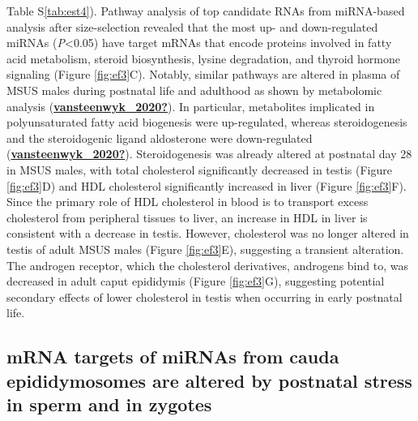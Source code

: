 \documentclass[12pt,twoside]{reedthesis}
\begin{document}
Table S\ref{tab:est4}). Pathway analysis of top candidate RNAs from miRNA-based
analysis after size-selection revealed that the most up- and
down-regulated miRNAs (\emph{P}\textless0.05) have target mRNAs that encode proteins
involved in fatty acid metabolism, steroid biosynthesis, lysine
degradation, and thyroid hormone signaling (Figure \ref{fig:ef3}C). Notably,
similar pathways are altered in plasma of MSUS males during postnatal
life and adulthood as shown by metabolomic analysis (\protect\hyperlink{ref-vansteenwyk_2020}{\textbf{vansteenwyk\_2020?}}). In
particular, metabolites implicated in polyunsaturated fatty acid
biogenesis were up-regulated, whereas steroidogenesis and the
steroidogenic ligand aldosterone were down-regulated (\protect\hyperlink{ref-vansteenwyk_2020}{\textbf{vansteenwyk\_2020?}}).
Steroidogenesis was already altered at postnatal day 28 in MSUS males,
with total cholesterol significantly decreased in testis (Figure \ref{fig:ef3}D)
and HDL cholesterol significantly increased in liver (Figure \ref{fig:ef3}F).
Since the primary role of HDL cholesterol in blood is to transport
excess cholesterol from peripheral tissues to liver, an increase in HDL
in liver is consistent with a decrease in testis. However, cholesterol
was no longer altered in testis of adult MSUS males (Figure \ref{fig:ef3}E),
suggesting a transient alteration. The androgen receptor, which the
cholesterol derivatives, androgens bind to, was decreased in adult caput
epididymis (Figure \ref{fig:ef3}G), suggesting potential secondary effects of
lower cholesterol in testis when occurring in early postnatal life.

\hypertarget{mrna-targets-of-mirnas-from-cauda-epididymosomes-are-altered-by-postnatal-stress-in-sperm-and-in-zygotes}{%
\subsection{mRNA targets of miRNAs from cauda epididymosomes are altered by postnatal stress in sperm and in zygotes}\label{mrna-targets-of-mirnas-from-cauda-epididymosomes-are-altered-by-postnatal-stress-in-sperm-and-in-zygotes}}
\end{document}
